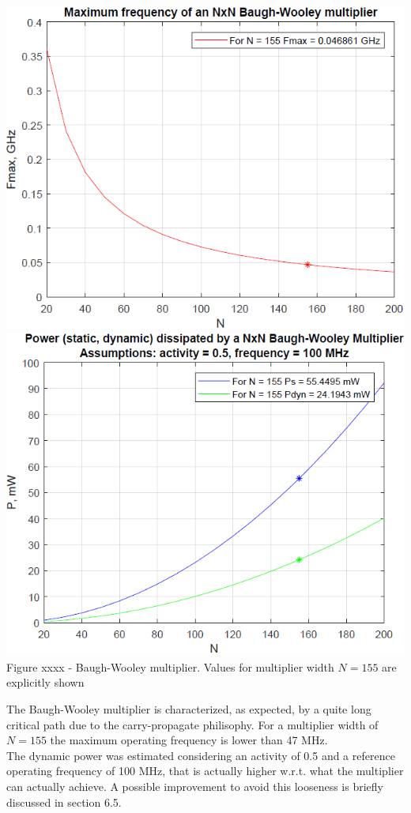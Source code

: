 \documentclass[11pt]{article} %
\begin{document}
\begin{center}
\includegraphics[scale=.48]{fmax_bw.PNG}
\includegraphics[scale=.48]{power_bw.PNG}
\small{Figure xxxx - Baugh-Wooley multiplier. Values for multiplier width $N=155$ are explicitly shown}
\end{center}
\vspace{1em}
The Baugh-Wooley multiplier is characterized, as expected, by a quite long critical path due to the carry-propagate philisophy. For a multiplier width of $N = 155$ the maximum operating frequency is lower than 47 MHz.\\
The dynamic power was estimated considering an activity of 0.5 and a reference operating frequency of 100 MHz, that is actually higher w.r.t. what the multiplier can actually achieve. A possible improvement to avoid this looseness is briefly discussed in section 6.5.
\vspace{3em}
\end{document}
